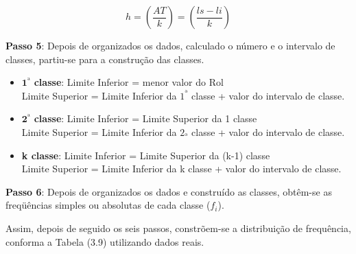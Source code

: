 $$ h = \left(\frac{AT}{k} \right)= \left(\frac{ls-li}{k} \right)$$

\textbf{Passo 5}: Depois de organizados os dados, calculado o número e o intervalo de classes, partiu-se para a construção das classes.


\begin{itemize}
\item $\textbf{1}^{ª}$ \textbf{classe}: Limite Inferior = menor valor do Rol\\
  Limite Superior = Limite Inferior da $1^{ª}$ classe + valor do intervalo de classe.
\item $\textbf{2}^{ª}$ \textbf{classe}: Limite Inferior = Limite Superior da 1 classe\\
Limite Superior = Limite Inferior da $2_{ª}$ classe + valor do intervalo de classe.
\item \textbf{k classe}: Limite Inferior = Limite Superior da (k-1) classe\\
Limite Superior = Limite Inferior da k classe + valor do intervalo de classe.
\end{itemize}

\textbf{Passo 6}: Depois de organizados os dados e construído as classes, obtêm-se as freqüências simples ou absolutas de cada classe ($f_{i}$).\vskip0.3cm

Assim, depois de seguido os seis passos, constrõem-se a distribuição de frequência, conforma a Tabela (3.9) utilizando dados reais.

\begin{table}[!htb]
\end{table}
\vskip0.1cm


